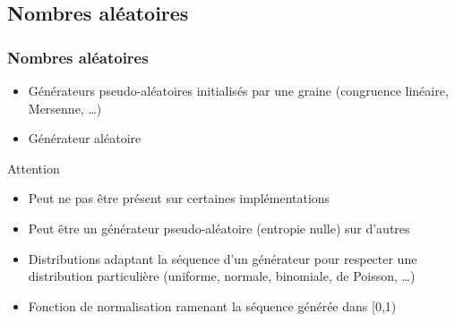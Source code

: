 \documentclass[C++.tex]{subfiles}
\begin{document}
\subsection*{Nombres aléatoires}
\begin{frame}[fragile]
	\frametitle{Nombres aléatoires}
	\begin{itemize}
		\item Générateurs pseudo-aléatoires initialisés par une graine (congruence linéaire, Mersenne, \ldots{})
		\item Générateur aléatoire
	\end{itemize}

	\begin{alertblock}{Attention}
		\begin{itemize}
			\item Peut ne pas être présent sur certaines implémentations
			\item Peut être un générateur pseudo-aléatoire (entropie nulle) sur d'autres
		\end{itemize}
	\end{alertblock}

	\begin{itemize}
		\item Distributions adaptant la séquence d'un générateur pour respecter une distribution particulière (uniforme, normale, binomiale, de Poisson, \ldots{})
		\item Fonction de normalisation ramenant la séquence générée dans [0,1)
	\end{itemize}
\end{frame}
\end{document}
